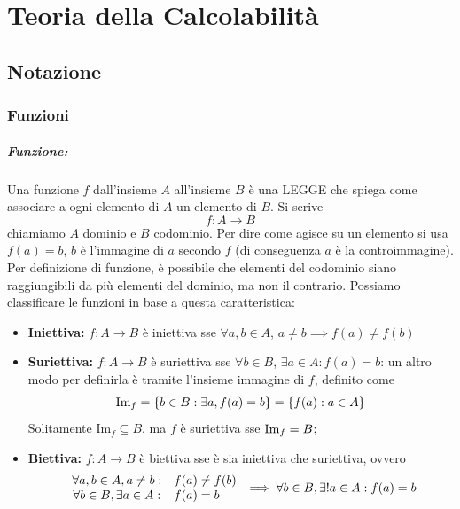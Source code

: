
\chapter{Teoria della Calcolabilità}

\section{Notazione}

\subsection{Funzioni}

\paragraph{Funzione:} Una funzione $f$ dall'insieme $A$ all'insieme $B$ è una LEGGE che spiega come associare a ogni elemento di $A$ un elemento di $B$. Si scrive
$$ f: A \rightarrow B $$
chiamiamo $A$ dominio e $B$ codominio. Per dire come agisce su un elemento si usa $f(a) = b$, $b$ è l'immagine di $a$ secondo $f$ (di conseguenza $a$ è la controimmagine).\\
Per definizione di funzione, è possibile che elementi del codominio siano raggiungibili da più elementi del dominio, ma non il contrario. Possiamo classificare le funzioni in base a questa caratteristica:
\begin{itemize}
	\item \textbf{Iniettiva:} $f: A \rightarrow B$ è iniettiva sse $\forall a,b \in A$, $a \neq b \implies f(a) \neq f(b)$
	\item \textbf{Suriettiva:} $f: A \rightarrow B$ è suriettiva sse $\forall b \in B$, $\exists a \in A: f(a) = b$: un altro modo per definirla è tramite l'insieme immagine di $f$, definito come
	$$ \text{Im}_f = \{b \in B: \exists a, f(a) = b \} = \{f(a): a \in A \} $$
	Solitamente $\text{Im}_f \subseteq B$, ma $f$ è suriettiva sse $ \text{Im}_f = B$;
	\item \textbf{Biettiva:} $f: A \rightarrow B$ è biettiva sse è sia iniettiva che suriettiva, ovvero
	$$
	\begin{array}{c l}
		\forall a, b \in A, a \neq b: & f(a) \neq f(b) \\
		\forall b \in B, \exists a \in A: & f(a) = b
	\end{array}
	\implies \forall b \in B, \exists! a \in A: f(a) = b
	$$
\end{itemize}

